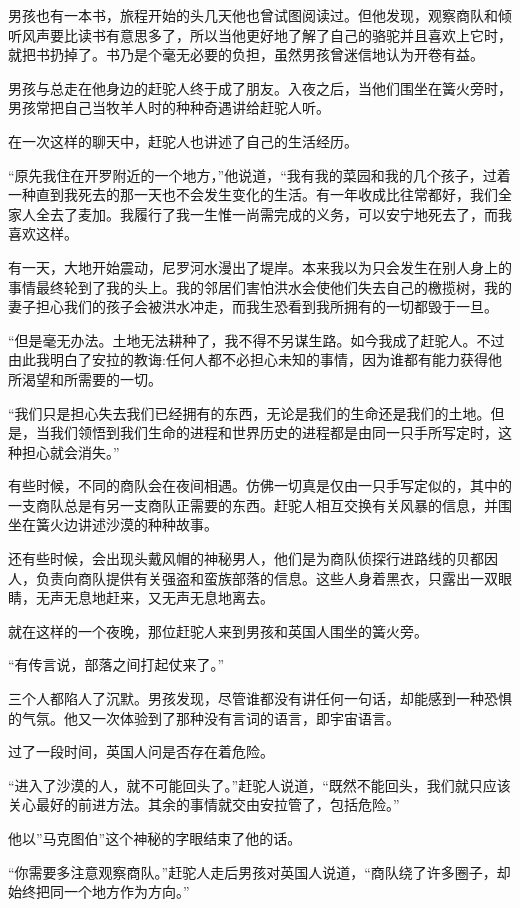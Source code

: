 \documentclass[twoside,openany]{book}
\begin{document}
男孩也有一本书，旅程开始的头几天他也曾试图阅读过。但他发现，观察商队和倾听风声要比读书有意思多了，所以当他更好地了解了自己的骆驼并且喜欢上它时，就把书扔掉了。书乃是个毫无必要的负担，虽然男孩曾迷信地认为开卷有益。

男孩与总走在他身边的赶驼人终于成了朋友。入夜之后，当他们围坐在簧火旁时，男孩常把自己当牧羊人时的种种奇遇讲给赶驼人听。

在一次这样的聊天中，赶驼人也讲述了自己的生活经历。

“原先我住在开罗附近的一个地方，”他说道，“我有我的菜园和我的几个孩子，过着一种直到我死去的那一天也不会发生变化的生活。有一年收成比往常都好，我们全家人全去了麦加。我履行了我一生惟一尚需完成的义务，可以安宁地死去了，而我喜欢这样。

有一天，大地开始震动，尼罗河水漫出了堤岸。本来我以为只会发生在别人身上的事情最终轮到了我的头上。我的邻居们害怕洪水会使他们失去自己的檄揽树，我的妻子担心我们的孩子会被洪水冲走，而我生恐看到我所拥有的一切都毁于一旦。

“但是毫无办法。土地无法耕种了，我不得不另谋生路。如今我成了赶驼人。不过由此我明白了安拉的教诲:任何人都不必担心未知的事情，因为谁都有能力获得他所渴望和所需要的一切。

“我们只是担心失去我们已经拥有的东西，无论是我们的生命还是我们的土地。但是，当我们领悟到我们生命的进程和世界历史的进程都是由同一只手所写定时，这种担心就会消失。”

有些时候，不同的商队会在夜间相遇。仿佛一切真是仅由一只手写定似的，其中的一支商队总是有另一支商队正需要的东西。赶驼人相互交换有关风暴的信息，并围坐在簧火边讲述沙漠的种种故事。

还有些时候，会出现头戴风帽的神秘男人，他们是为商队侦探行进路线的贝都因人，负责向商队提供有关强盗和蛮族部落的信息。这些人身着黑衣，只露出一双眼睛，无声无息地赶来，又无声无息地离去。

就在这样的一个夜晚，那位赶驼人来到男孩和英国人围坐的簧火旁。

“有传言说，部落之间打起仗来了。”

三个人都陷人了沉默。男孩发现，尽管谁都没有讲任何一句话，却能感到一种恐惧的气氛。他又一次体验到了那种没有言词的语言，即宇宙语言。

过了一段时间，英国人问是否存在着危险。

“进入了沙漠的人，就不可能回头了。”赶驼人说道，“既然不能回头，我们就只应该关心最好的前进方法。其余的事情就交由安拉管了，包括危险。”

他以”马克图伯”这个神秘的字眼结束了他的话。

“你需要多注意观察商队。”赶驼人走后男孩对英国人说道，“商队绕了许多圈子，却始终把同一个地方作为方向。”
\end{document}
